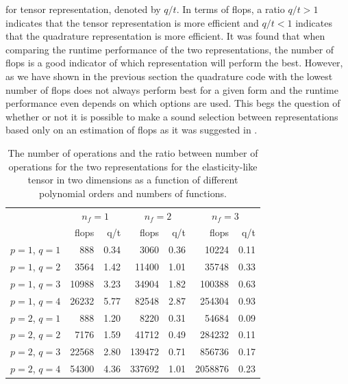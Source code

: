 for tensor representation, denoted by $q/t$.
In terms of flops, a ratio $q/t > 1$ indicates that the tensor representation is
more efficient and $q/t < 1$ indicates that the quadrature representation is
more efficient.
It was found that when comparing the runtime performance of the two
representations, the number of flops is a good indicator of which
representation will perform the best.
However, as we have shown in the previous section the quadrature code with the
lowest number of flops does not always perform best for a given form and
the runtime performance even depends on which  options are used.
This begs the question of whether or not it is possible to make a sound
selection between representations based only on an estimation of flops as
it was suggested in \citet{OlgaardWells2010}.
%
\begin{table}
\caption{The number of operations and the ratio between number of operations
         for the two representations for the elasticity-like tensor in two
         dimensions as a function of different polynomial orders and numbers of
         functions.}
\label{oelgaard-2:tab:elasticity2D_complex_comparison}
\begin{center}\small
\begin{tabular}{l|rr|rr|rr}
\multicolumn{1}{c}{} & \multicolumn{2}{c}{$n_f = 1$} & \multicolumn{2}{c}{$n_f = 2$} & \multicolumn{2}{c}{$n_f = 3$}\\
                  & flops & q/t          & flops & q/t          & flops & q/t\\
\hline
$p = 1$, $q = 1$  &    888  &  0.34               &    3060 &  0.36               &   10224 & 0.11\\
$p = 1$, $q = 2$  &   3564  &  1.42               &   11400 &  1.01               &   35748 & 0.33\\
$p = 1$, $q = 3$  &  10988  &  3.23               &   34904 &  1.82               &  100388 & 0.63\\
$p = 1$, $q = 4$  &  26232  &  5.77               &   82548 &  2.87               &  254304 & 0.93\\
\hline
$p = 2$, $q = 1$  &    888  &  1.20               &    8220 &  0.31               &   54684 & 0.09\\
$p = 2$, $q = 2$  &   7176  &  1.59               &   41712 &  0.49               &  284232 & 0.11\\
$p = 2$, $q = 3$  &  22568  &  2.80               &  139472 &  0.71               &  856736 & 0.17\\
$p = 2$, $q = 4$  &  54300  &  4.36               &  337692 &  1.01               & 2058876 & 0.23\\

\end{tabular}
\end{center}
\end{table}
